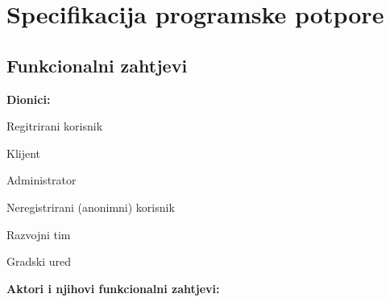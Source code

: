 \chapter{Specifikacija programske potpore}
		
	\section{Funkcionalni zahtjevi}
			
			\noindent \textbf{Dionici:}
			
			\begin{packed_enum}
				
				\item Regitrirani korisnik
					\begin{packed_enum}
						\item Klijent
						\item Administrator
					\end{packed_enum}
				\item Neregistrirani (anonimni) korisnik
				\item Razvojni tim
				\item Gradski ured
				
			\end{packed_enum}
			
			\noindent \textbf{Aktori i njihovi funkcionalni zahtjevi:}
			
